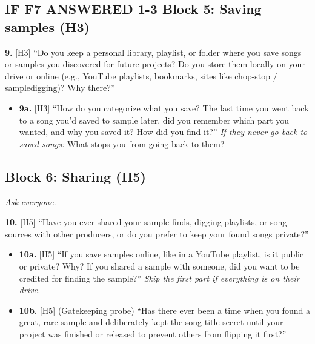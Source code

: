 \documentclass[12pt,a4paper]{report}
\begin{document}
\subsection{\texorpdfstring{\textcolor{condition}{IF F7 ANSWERED 1-3}}{IF F7 ANSWERED 1-3} Block 5: Saving samples (H3)}
\textbf{9.} [H3] “Do you keep a personal library, playlist, or folder where you save songs or samples you discovered for future projects? Do you store them locally on your drive or online (e.g., YouTube playlists, bookmarks, sites like chop-stop / sampledigging)? Why there?”
\begin{itemize}[itemsep=2pt]
\item \textbf{9a.} [H3] “How do you categorize what you save? The last time you went back to a song you’d saved to sample later, did you remember which part you wanted, and why you saved it? How did you find it?” \emph{If they never go back to saved songs:} What stops you from going back to them?
\end{itemize}

\subsection{Block 6: Sharing (H5)}
\emph{Ask everyone.}

\textbf{10.} [H5] “Have you ever shared your sample finds, digging playlists, or song sources with other producers, or do you prefer to keep your found songs private?”
\begin{itemize}[itemsep=2pt]
\item \textbf{10a.} [H5] “If you save samples online, like in a YouTube playlist, is it public or private? Why? If you shared a sample with someone, did you want to be credited for finding the sample?” \emph{Skip the first part if everything is on their drive.}
\item \textbf{10b.} [H5] (Gatekeeping probe) “Has there ever been a time when you found a great, rare sample and deliberately kept the song title secret until your project was finished or released to prevent others from flipping it first?”
\end{itemize}
\end{document}
